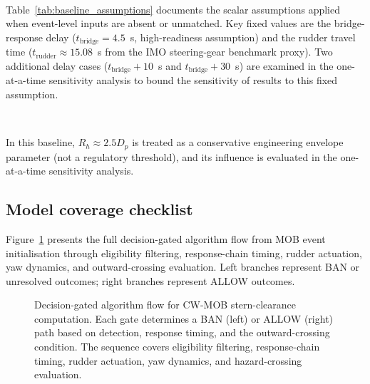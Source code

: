 \documentclass[preprint,12pt]{elsarticle}
\begin{document}
\begin{table}[H]
\centering
{}\
\caption{Executable inputs and variable mapping for the baseline run.}
\label{tab:data_mapping}
\end{table}

Table~\ref{tab:baseline_assumptions} documents the scalar assumptions applied when event-level inputs are absent or unmatched. Key fixed values are the bridge-response delay ($t_{\mathrm{bridge}}=4.5$~s, high-readiness assumption) and the rudder travel time ($t_{\mathrm{rudder}}\approx15.08$~s from the IMO steering-gear benchmark proxy). Two additional delay cases ($t_{\mathrm{bridge}}+10$~s and $t_{\mathrm{bridge}}+30$~s) are examined in the one-at-a-time sensitivity analysis to bound the sensitivity of results to this fixed assumption.

\begin{table}[H]
\centering
{}\
\caption{Baseline assumptions used in the current implementation.}
\label{tab:baseline_assumptions}
\end{table}

In this baseline, $R_h\approx2.5D_p$ is treated as a conservative engineering envelope parameter (not a regulatory threshold), and its influence is evaluated in the one-at-a-time sensitivity analysis.

\subsection{Model coverage checklist}
Figure~\ref{fig:algorithm_pipeline} presents the full decision-gated algorithm flow from MOB event initialisation through eligibility filtering, response-chain timing, rudder actuation, yaw dynamics, and outward-crossing evaluation. Left branches represent BAN or unresolved outcomes; right branches represent ALLOW outcomes.

\begin{figure}[H]
    \centering
    \caption{Decision-gated algorithm flow for CW-MOB stern-clearance computation. Each gate determines a BAN (left) or ALLOW (right) path based on detection, response timing, and the outward-crossing condition. The sequence covers eligibility filtering, response-chain timing, rudder actuation, yaw dynamics, and hazard-crossing evaluation.}
    \label{fig:algorithm_pipeline}
\end{figure}
\end{document}
